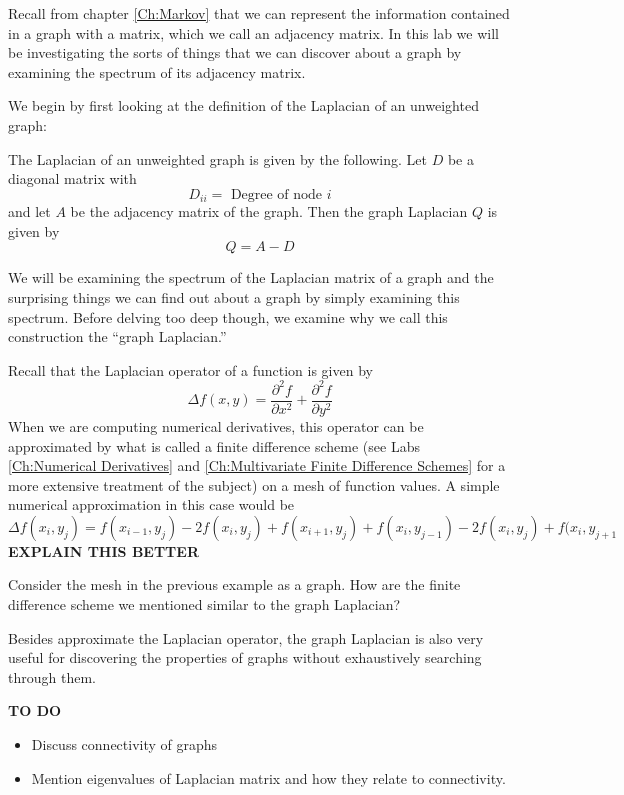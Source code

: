 \label{Ch:EigGraph}


Recall from chapter \ref{Ch:Markov} that we can represent the information contained in a graph with a matrix, which we call an adjacency matrix.  In this lab we will be investigating the sorts of things that we can discover about a graph by examining the spectrum of its adjacency matrix.

We begin by first looking at the definition of the Laplacian of an unweighted graph:
\begin{definition}  The Laplacian of an unweighted graph is given by the following.  Let $D$ be a diagonal matrix with
\[
D_{ii} = \mbox{ Degree of node $i$}
\]
and let $A$ be the adjacency matrix of the graph.  Then the graph Laplacian $Q$ is given by
\[
Q = A - D
\]
\end{definition}

We will be examining the spectrum of the Laplacian matrix of a graph and the surprising things we can find out about a graph by simply examining this spectrum.  Before delving too deep though, we examine why we call this construction the ``graph Laplacian.''

Recall that the Laplacian operator of a function is given by
\[
\Delta f(x,y) = \frac{\partial ^2 f}{\partial x^2} + \frac{\partial ^2 f}{\partial y^2}
\]
When we are computing numerical derivatives, this operator can be approximated by what is called a finite difference scheme (see Labs \ref{Ch:Numerical Derivatives} and \ref{Ch:Multivariate Finite Difference Schemes} for a more extensive treatment of the subject) on a mesh of function values.  A simple numerical approximation in this case would be
\[
\Delta f(x_i,y_j) = f(x_{i-1},y_j) - 2f(x_i,y_j) + f(x_{i+1},y_j) + f(x_i,y_{j-1}) - 2f(x_i,y_j) + f(x_i,y_{j+1}
\]
{\bf EXPLAIN THIS BETTER}

\begin{problem} Consider the mesh in the previous example as a graph.  How are the finite difference scheme we mentioned similar to the graph Laplacian?
\end{problem}

Besides approximate the Laplacian operator, the graph Laplacian is also very useful for discovering the properties of graphs without exhaustively searching through them.

{\bf TO DO}
\begin{itemize}
\item Discuss connectivity of graphs
\item Mention eigenvalues of Laplacian matrix and how they relate to connectivity.
\end{itemize}

